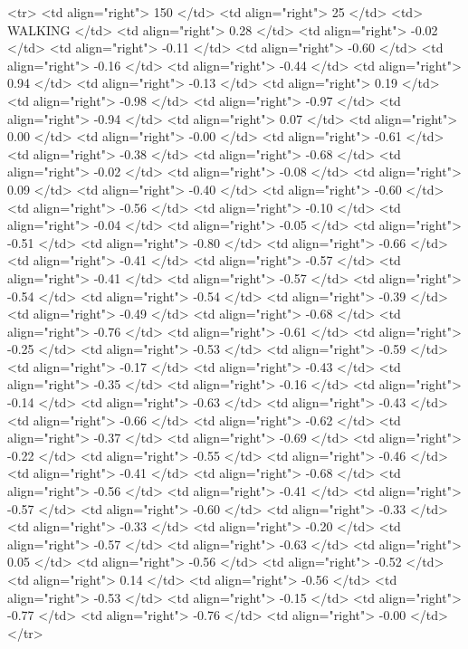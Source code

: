   <tr> <td align="right"> 150 </td> <td align="right">  25 </td> <td> WALKING </td> <td align="right"> 0.28 </td> <td align="right"> -0.02 </td> <td align="right"> -0.11 </td> <td align="right"> -0.60 </td> <td align="right"> -0.16 </td> <td align="right"> -0.44 </td> <td align="right"> 0.94 </td> <td align="right"> -0.13 </td> <td align="right"> 0.19 </td> <td align="right"> -0.98 </td> <td align="right"> -0.97 </td> <td align="right"> -0.94 </td> <td align="right"> 0.07 </td> <td align="right"> 0.00 </td> <td align="right"> -0.00 </td> <td align="right"> -0.61 </td> <td align="right"> -0.38 </td> <td align="right"> -0.68 </td> <td align="right"> -0.02 </td> <td align="right"> -0.08 </td> <td align="right"> 0.09 </td> <td align="right"> -0.40 </td> <td align="right"> -0.60 </td> <td align="right"> -0.56 </td> <td align="right"> -0.10 </td> <td align="right"> -0.04 </td> <td align="right"> -0.05 </td> <td align="right"> -0.51 </td> <td align="right"> -0.80 </td> <td align="right"> -0.66 </td> <td align="right"> -0.41 </td> <td align="right"> -0.57 </td> <td align="right"> -0.41 </td> <td align="right"> -0.57 </td> <td align="right"> -0.54 </td> <td align="right"> -0.54 </td> <td align="right"> -0.39 </td> <td align="right"> -0.49 </td> <td align="right"> -0.68 </td> <td align="right"> -0.76 </td> <td align="right"> -0.61 </td> <td align="right"> -0.25 </td> <td align="right"> -0.53 </td> <td align="right"> -0.59 </td> <td align="right"> -0.17 </td> <td align="right"> -0.43 </td> <td align="right"> -0.35 </td> <td align="right"> -0.16 </td> <td align="right"> -0.14 </td> <td align="right"> -0.63 </td> <td align="right"> -0.43 </td> <td align="right"> -0.66 </td> <td align="right"> -0.62 </td> <td align="right"> -0.37 </td> <td align="right"> -0.69 </td> <td align="right"> -0.22 </td> <td align="right"> -0.55 </td> <td align="right"> -0.46 </td> <td align="right"> -0.41 </td> <td align="right"> -0.68 </td> <td align="right"> -0.56 </td> <td align="right"> -0.41 </td> <td align="right"> -0.57 </td> <td align="right"> -0.60 </td> <td align="right"> -0.33 </td> <td align="right"> -0.33 </td> <td align="right"> -0.20 </td> <td align="right"> -0.57 </td> <td align="right"> -0.63 </td> <td align="right"> 0.05 </td> <td align="right"> -0.56 </td> <td align="right"> -0.52 </td> <td align="right"> 0.14 </td> <td align="right"> -0.56 </td> <td align="right"> -0.53 </td> <td align="right"> -0.15 </td> <td align="right"> -0.77 </td> <td align="right"> -0.76 </td> <td align="right"> -0.00 </td> </tr>
